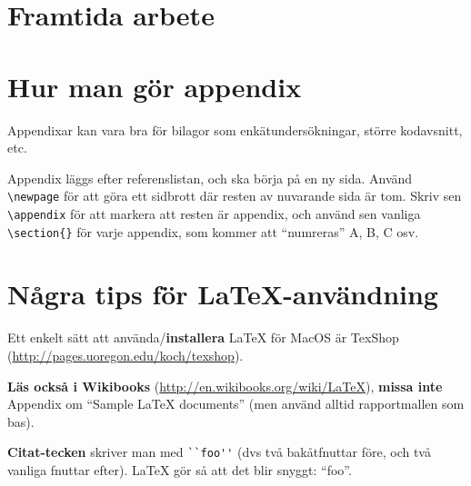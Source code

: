\documentclass[swedish, a4paper,12pt]{article}
\begin{document}
\section{Framtida arbete}

\newpage

%



\newpage
\appendix %
\iffalse \section{Hur man gör appendix}
Appendixar kan vara bra för bilagor som enkätundersökningar, större kodavsnitt, etc.

Appendix läggs efter referenslistan, och ska börja på en ny sida. Använd \verb|\newpage| för att göra ett sidbrott där resten av nuvarande sida är tom. Skriv sen \verb|\appendix| för att markera att resten är appendix, och
 använd sen vanliga \verb|\section{}| för varje appendix, som kommer att ``numreras'' A, B, C osv.

\section{Några tips för La\TeX-användning}

Ett enkelt sätt att använda/\textbf{installera} LaTeX för MacOS är TexShop (\url{http://pages.uoregon.edu/koch/texshop}).

\textbf{Läs också i Wikibooks} (\url{http://en.wikibooks.org/wiki/LaTeX}), \textbf{missa inte} Appendix om ``Sample LaTeX documents'' (men använd alltid rapportmallen som bas).

\textbf{Citat-tecken} skriver man med \verb|``foo''| (dvs två bakåtfnuttar före, och två vanliga fnuttar efter). LaTeX gör så att det blir snyggt: ``foo''.
\end{document}

